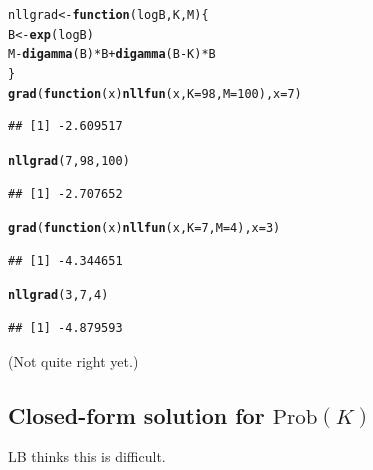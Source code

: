 \documentclass{article}\usepackage[]{graphicx}\usepackage[]{color}
\makeatletter
\newcommand{\hlnum}[1]{\textcolor[rgb]{0.686,0.059,0.569}{#1}}%
\newcommand{\hlopt}[1]{\textcolor[rgb]{0,0,0}{#1}}%
\newcommand{\hlstd}[1]{\textcolor[rgb]{0.345,0.345,0.345}{#1}}%
\newcommand{\hlkwa}[1]{\textcolor[rgb]{0.161,0.373,0.58}{\textbf{#1}}}%
\newcommand{\hlkwb}[1]{\textcolor[rgb]{0.69,0.353,0.396}{#1}}%
\newcommand{\hlkwc}[1]{\textcolor[rgb]{0.333,0.667,0.333}{#1}}%
\newcommand{\hlkwd}[1]{\textcolor[rgb]{0.737,0.353,0.396}{\textbf{#1}}}%
\newenvironment{kframe}{%
 \def\at@end@of@kframe{}%
 \ifinner\ifhmode%
  \def\at@end@of@kframe{\end{minipage}}%
  \begin{minipage}{\columnwidth}%
 \fi\fi%
 \def\FrameCommand##1{\hskip\@totalleftmargin \hskip-\fboxsep
 \colorbox{shadecolor}{##1}\hskip-\fboxsep
     \hskip-\linewidth \hskip-\@totalleftmargin \hskip\columnwidth}%
 \MakeFramed {\advance\hsize-\width
   \@totalleftmargin\z@ \linewidth\hsize
   \@setminipage}}%
 {\par\unskip\endMakeFramed%
 \at@end@of@kframe}
\newenvironment{knitrout}{}{} %
\makeatother
\begin{document}
\begin{knitrout}
\color{fgcolor}\begin{kframe}
\begin{alltt}
\hlstd{nllgrad} \hlkwb{<-} \hlkwa{function}\hlstd{(}\hlkwc{logB}\hlstd{,}\hlkwc{K}\hlstd{,}\hlkwc{M}\hlstd{) \{}
    \hlstd{B} \hlkwb{<-} \hlkwd{exp}\hlstd{(logB)}
    \hlstd{M} \hlopt{-} \hlkwd{digamma}\hlstd{(B)}\hlopt{*}\hlstd{B}\hlopt{+}\hlkwd{digamma}\hlstd{(B}\hlopt{-}\hlstd{K)}\hlopt{*}\hlstd{B}
\hlstd{\}}
\hlkwd{grad}\hlstd{(}\hlkwa{function}\hlstd{(}\hlkwc{x}\hlstd{)} \hlkwd{nllfun}\hlstd{(x,}\hlkwc{K}\hlstd{=}\hlnum{98}\hlstd{,}\hlkwc{M}\hlstd{=}\hlnum{100}\hlstd{),}\hlkwc{x}\hlstd{=}\hlnum{7}\hlstd{)}
\end{alltt}
\begin{verbatim}
## [1] -2.609517
\end{verbatim}
\begin{alltt}
\hlkwd{nllgrad}\hlstd{(}\hlnum{7}\hlstd{,}\hlnum{98}\hlstd{,}\hlnum{100}\hlstd{)}
\end{alltt}
\begin{verbatim}
## [1] -2.707652
\end{verbatim}
\begin{alltt}
\hlkwd{grad}\hlstd{(}\hlkwa{function}\hlstd{(}\hlkwc{x}\hlstd{)} \hlkwd{nllfun}\hlstd{(x,}\hlkwc{K}\hlstd{=}\hlnum{7}\hlstd{,}\hlkwc{M}\hlstd{=}\hlnum{4}\hlstd{),}\hlkwc{x}\hlstd{=}\hlnum{3}\hlstd{)}
\end{alltt}
\begin{verbatim}
## [1] -4.344651
\end{verbatim}
\begin{alltt}
\hlkwd{nllgrad}\hlstd{(}\hlnum{3}\hlstd{,}\hlnum{7}\hlstd{,}\hlnum{4}\hlstd{)}
\end{alltt}
\begin{verbatim}
## [1] -4.879593
\end{verbatim}
\end{kframe}
\end{knitrout}
(Not quite right yet.)

\subsection{Closed-form solution for $\mbox{Prob}(K)$}

LB thinks this is difficult.
\end{document}

